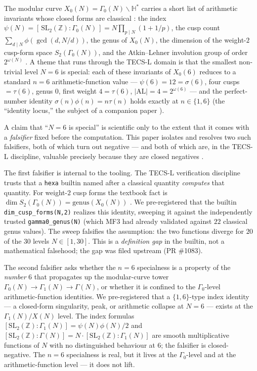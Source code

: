\documentclass[11pt,a4paper]{article}
\newcommand{\sig}{\sigma}
\newcommand{\Gz}{\Gamma_0}
\newcommand{\Go}{\Gamma_1}
\theoremstyle{definition}
\begin{document}
The modular curve $X_0(N) = \Gz(N)\backslash\mathbb{H}^*$ carries a short list
of arithmetic invariants whose closed forms are classical
\citep{diamond-shurman,shimura}: the index $\psi(N) = [\,\mathrm{SL}_2(\mathbb{Z}):\Gz(N)\,]
= N\prod_{p\mid N}(1+1/p)$, the cusp count
$\sum_{d\mid N}\phi(\gcd(d,N/d))$, the genus of $X_0(N)$, the dimension of the
weight-$2$ cusp-form space $S_2(\Gz(N))$, and the Atkin--Lehner involution
group of order $2^{\omega(N)}$ \citep{atkin-lehner}. A theme that runs through
the TECS-L domain is that the smallest non-trivial level $N=6$ is special: each
of these invariants of $X_0(6)$ reduces to a standard $n=6$ arithmetic-function
value --- $\psi(6)=12=\sig(6)$, four cusps $=\tau(6)$, genus $0$, first weight
$4=\tau(6)$, $|\mathrm{AL}|=4=2^{\omega(6)}$ --- and the perfect-number identity
$\sig(n)\phi(n)=n\tau(n)$ holds exactly at $n\in\{1,6\}$ (the ``identity
locus,'' the subject of a companion paper \citep{tecs-l-locus}).

A claim that ``$N=6$ is special'' is scientific only to the extent that it comes
with a \emph{falsifier} fixed before the computation. This paper isolates and
resolves two such falsifiers, both of which turn out negative --- and both of
which are, in the TECS-L discipline, valuable precisely because they are closed
negatives \citep{tecs-l-negative-ok}.

The first falsifier is internal to the tooling. The TECS-L verification
discipline trusts that a \texttt{hexa} builtin named after a classical quantity
\emph{computes} that quantity. For weight-$2$ cusp forms the textbook fact is
$\dim S_2(\Gz(N)) = \mathrm{genus}(X_0(N))$ \citep{diamond-shurman}. We
pre-registered that the builtin \texttt{dim\_cusp\_forms(N,2)} realizes this
identity, sweeping it against the independently trusted
\texttt{gamma0\_genus(N)} (which MF3 had already validated against $22$ classical
genus values). The sweep falsifies the assumption: the two functions diverge for
$20$ of the $30$ levels $N\in[1,30]$. This is a \emph{definition gap} in the
builtin, not a mathematical falsehood; the gap was filed upstream (PR \#1083).

The second falsifier asks whether the $n=6$ specialness is a property of the
\emph{number} $6$ that propagates up the modular-curve tower
$\Gz(N)\!\to\!\Go(N)\!\to\!\Gamma(N)$, or whether it is confined to the
$\Gz$-level arithmetic-function identities. We pre-registered that a
$\{1,6\}$-type index identity --- a closed-form singularity, peak, or
arithmetic collapse at $N=6$ --- exists at the $\Go(N)/X(N)$ level. The index
formulas $[\mathrm{SL}_2(\mathbb{Z}):\Go(N)]=\psi(N)\phi(N)/2$ and
$[\mathrm{SL}_2(\mathbb{Z}):\Gamma(N)]=N\cdot[\mathrm{SL}_2(\mathbb{Z}):\Go(N)]$
are smooth multiplicative functions of $N$ with no distinguished behaviour at
$6$; the falsifier is closed-negative. The $n=6$ specialness is real, but it
lives at the $\Gz$-level and at the arithmetic-function level --- it does not
lift.
\end{document}
